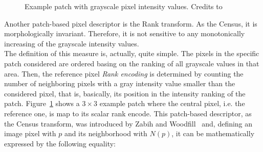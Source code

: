 \begin{figure}[t]
	\centering
\caption{Example patch with grayscale pixel intensity values. Credits to~\cite{Demetz2013}}
\label{fig:rank-example}
\end{figure}

Another patch-based pixel descriptor is the Rank transform.
As the Census, it is morphologically invariant.
Therefore, it is not sensitive to any monotonically increasing of the grayscale intensity values. \\
The definition of this measure is, actually, quite simple.
The pixels in the specific patch considered are ordered basing on the ranking of all grayscale values in that area. 
Then, the reference pixel \textit{Rank encoding} is determined by counting the number of neighboring pixels with a gray intensity value smaller than the considered pixel, that is, basically, its position in the intensity ranking of the patch.
Figure~\ref{fig:rank-example} shows a $3 \times 3$ example patch where the central pixel, i.e. the reference one, is map to its scalar rank encode. 
This patch-based descriptor, as the Census transform, was introduced by Zabih and Woodfill~\cite{Zabih1994} and, defining an image pixel with $p$ and its neighborhood with $N(p)$, it can be mathematically expressed by the following equality:

